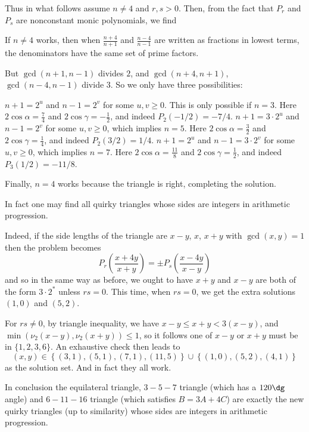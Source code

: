 \documentclass[11pt]{scrartcl}
\begin{document}
Thus in what follows assume $n \neq 4$ and $r,s > 0$.
Then, from the fact that $P_r$ and $P_s$ are nonconstant
monic polynomials, we find
\begin{corollary*}
  If $n \neq 4$ works, then when $\frac{n+4}{n+1}$
  and $\frac{n-4}{n-1}$ are written as fractions in lowest terms,
  the denominators have the same set of prime factors.
\end{corollary*}
But $\gcd(n+1, n-1)$ divides $2$, and $\gcd(n+4, n+1)$, $\gcd(n-4,n-1)$ divide $3$.
So we only have three possibilities:
\begin{itemize}
  \ii $n+1 = 2^u$ and $n-1 = 2^v$ for some $u,v \ge 0$.
  This is only possible if $n = 3$.
  Here $2\cos\alpha = \frac74$ and $2\cos\gamma = -\frac12$,
  and indeed $P_2(-1/2) = -7/4$.
  \ii $n+1 = 3 \cdot 2^u$ and $n-1 = 2^v$ for some $u,v \ge 0$,
  which implies $n = 5$.
  Here $2\cos\alpha = \frac32$ and $2\cos\gamma = \frac14$,
  and indeed $P_2(3/2) = 1/4$.
  \ii $n+1 = 2^u$ and $n-1 = 3 \cdot 2^v$ for some $u,v \ge 0$,
  which implies $n = 7$.
  Here $2\cos\alpha = \frac{11}{8}$ and $2\cos\gamma = \frac12$,
  and indeed $P_3(1/2) = -11/8$.
\end{itemize}
Finally, $n=4$ works because the triangle is right, completing the solution.

\begin{remark*}
  In fact one may find all quirky triangles
  whose sides are integers in arithmetic progression.

  Indeed, if the side lengths of the triangle are $x-y$, $x$, $x+y$
  with $\gcd(x,y) = 1$ then the problem becomes
  \[ P_r\left( \frac{x+4y}{x+y} \right) = \pm P_s \left( \frac{x-4y}{x-y} \right) \]
  and so in the same way as before,
  we ought to have $x+y$ and $x-y$ are both of the form $3 \cdot 2^{\ast}$ unless $rs = 0$.
  This time, when $rs=0$, we get the extra solutions $(1,0)$ and $(5,2)$.

  For $rs \neq 0$, by triangle inequality, we have $x-y \le x+y < 3(x-y)$,
  and $\min(\nu_2(x-y), \nu_2(x+y)) \le 1$,
  so it follows one of $x-y$ or $x+y$ must be in $\{1,2,3,6\}$.
  An exhaustive check then leads to
  \[ (x,y) \in \left\{ (3,1), (5,1), (7,1), (11,5) \right\}
    \cup \left\{ (1,0), (5,2), (4,1) \right\} \]
  as the solution set. And in fact they all work.

  In conclusion the equilateral triangle, $3-5-7$ triangle (which has a $120\dg$ angle)
  and $6-11-16$ triangle (which satisfies $B=3A+4C$)
  are exactly the new quirky triangles (up to similarity)
  whose sides are integers in arithmetic progression.
\end{remark*}
\pagebreak
\end{document}
